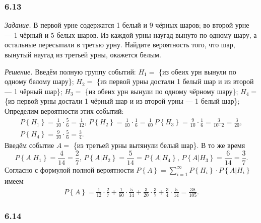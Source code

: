 \subsubsection*{6.13}

\textit{Задание.} В первой урне содержатся 1 белый и 9 чёрных шаров; во второй урне --- 1 чёрный и 5 белых шаров.
Из каждой урны наугад вынуто по одному шару, а остальные пересыпали в третью урну.
Найдите вероятность того, что шар, вынутый наугад из третьей урны, окажется белым.

\textit{Решение.}
Введём полную группу событий:
$H_1 =$ \{из обеих урн вынули по одному белому шару\};
$H_2 =$ \{из первой урны достали 1 белый шар и из второй --- 1 чёрный шар\};
$H_3 =$ \{из обеих урн вынули по одному чёрному шару\};
$H_4 =$ \{из первой урны достали 1 чёрный шар и из второй урны --- 1 белый шар\};
Определим вероятности этих событий:
\begin{equation*}
\begin{split}
P \left\{ H_1 \right\} =
\frac{1}{10} \cdot \frac{5}{6} =
\frac{1}{12}, \,
P \left\{ H_2 \right\} =
\frac{1}{10} \cdot \frac{1}{6} =
\frac{1}{60} \,
P \left\{ H_3 \right\} =
\frac{9}{10} \cdot \frac{1}{6} =
\frac{3}{10 \cdot 2} =
\frac{3}{20}, \\
P \left\{ H_4 \right\} =
\frac{9}{10} \cdot \frac{5}{6} =
\frac{3}{4}.
\end{split}
\end{equation*}
Введём событие $A =$ \{из третьей урны вытянули белый шар\}.
В то же время
$$P \left\{ \left. A \right| H_1 \right\} =
\frac{4}{14} =
\frac{2}{7}, \,
P \left\{ \left. A \right| H_2 \right\} =
\frac{5}{14} =
P \left\{ \left. A \right| H_4 \right\}, \,
P \left\{ \left. A \right| H_3 \right\} =
\frac{6}{14} =
\frac{3}{7}.$$
Согласно с формулой полной вероятности $P \left\{ A \right\} = \sum \limits_{i=1}^\infty P \left\{ H_i \right\} \cdot P \left\{ \left. A \right| H_i \right\} $ имеем
\begin{equation*}
\begin{split}
P \left\{ A \right\} =
\frac{1}{12} \cdot \frac{2}{7} + \frac{1}{60} \cdot \frac{5}{14} + \frac{3}{20} \cdot \frac{3}{7} + \frac{3}{4} \cdot \frac{5}{14} =
\frac{38}{105}.
\end{split}
\end{equation*}

\subsubsection*{6.14}

